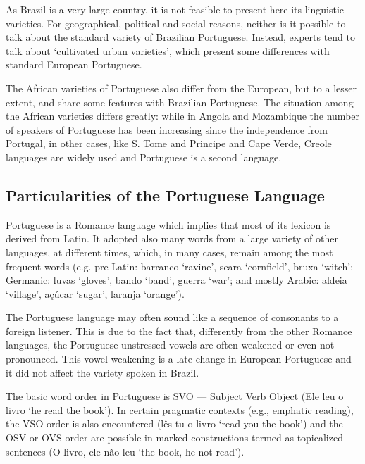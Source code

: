 \documentclass[]{../metanetpaper}
\begin{document}
\begin{multicols}{2}
As Brazil is a very large country, it is not feasible to present here its linguistic varieties. For geographical, political and social reasons, neither is it possible to talk about the standard variety of Brazilian Portuguese. Instead, experts tend to talk about ‘cultivated urban varieties’, which present some differences with standard European Portuguese. 

The African varieties of Portuguese also differ from the European, but to a lesser extent, and share some features with Brazilian Portuguese. The situation among the African varieties differs greatly: while in Angola and Mozambique the number of speakers of Portuguese has been increasing since the independence from Portugal, in other cases, like S. Tome and Principe and Cape Verde, Creole languages are widely used and Portuguese is a second language.

\subsection{Particularities of the Portuguese Language}

 Portuguese is a Romance language\cite{cardeira} which implies that most of its lexicon is derived from Latin. It adopted also many words from a large variety of other languages, at different times, which, in many cases, remain among the most frequent words (e.g. pre-Latin: barranco ‘ravine’, seara ‘cornfield’, bruxa ‘witch’; Germanic: luvas ‘gloves’, bando ‘band’, guerra ‘war’; and mostly Arabic: aldeia ‘village’, açúcar ‘sugar’, laranja ‘orange’).


The Portuguese language may often sound like a sequence of consonants to a foreign listener. This is due to the fact that, differently from the other Romance languages, the Portuguese unstressed vowels are often weakened or even not pronounced. This vowel weakening is a late change in European Portuguese and it did not affect the variety spoken in Brazil.

The basic word order in Portuguese is SVO — Subject Verb Object (Ele leu o livro ‘he read the book'). In certain pragmatic contexts (e.g., emphatic reading), the VSO order is also encountered (lês tu o livro ‘read you the book’) and the OSV or OVS order are possible in marked constructions termed as topicalized sentences (O livro, ele não leu ‘the book, he not read’).


\end{multicols}
\end{document}
